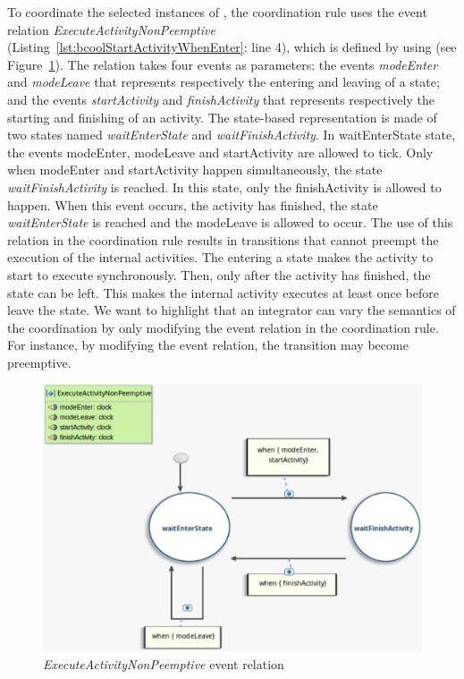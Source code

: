 To coordinate the selected instances of \dse, the coordination rule uses the event relation \emph{ExecuteActivityNonPeemptive} (Listing~\ref{lst:bcoolStartActivityWhenEnter}: line 4), which is defined by using \moccml (see Figure~\ref{fig:looprelation}). The relation takes four events as parameters: the events \emph{modeEnter} and \emph{modeLeave} that represents respectively the entering and leaving of a state; and the events \emph{startActivity} and \emph{finishActivity} that represents respectively the starting and finishing of an activity. The state-based representation is made of two states named \emph{waitEnterState} and \emph{waitFinishActivity}. In waitEnterState state, the events modeEnter, modeLeave and startActivity are allowed to tick. Only when modeEnter and startActivity happen simultaneously, the state \emph{waitFinishActivity} is reached. In this state, only the finishActivity is allowed to happen. When this event occurs, \ie the activity has finished, the state \emph{waitEnterState} is reached and the modeLeave is allowed to occur. The use of this relation in the coordination rule results in transitions that cannot preempt the execution of the internal activities. The entering a state makes the activity to start to execute synchronously. Then, only after the activity has finished, the state can be left. This makes the internal activity executes at least once before leave the state. We want to highlight that an integrator can vary the semantics of the coordination by only modifying the event relation in the coordination rule. For instance, by modifying the event relation, the transition may become preemptive. 
	 
	 \begin{figure}[h]
	 	\center
	 	\includegraphics[width=.7\columnwidth]{examples/figs/ExecuteActivityNonPeemptive}
	 	\caption{\emph{ExecuteActivityNonPeemptive} event relation}
	 	\label{fig:looprelation}
	 \end{figure}
	 
